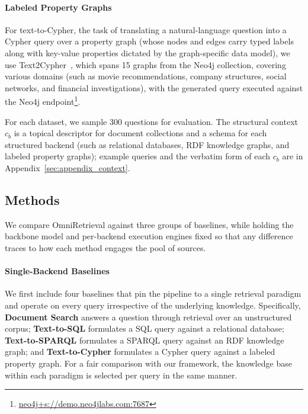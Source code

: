 \vspace{-0.075in}
\paragraph{Labeled Property Graphs}
For text-to-Cypher, the task of translating a natural-language question into a Cypher query over a property graph (whose nodes and edges carry typed labels along with key-value properties dictated by the graph-specific data model), we use Text2Cypher~\citep{Text2Cypher}, which spans 15 graphs from the Neo4j collection, covering various domains (such as movie recommendations, company structures, social networks, and financial investigations), with the generated query executed against the Neo4j endpoint\footnote{\url{neo4j+s://demo.neo4jlabs.com:7687}}.

For each dataset, we sample 300 questions for evaluation. The structural context $c_b$ is a topical descriptor for document collections and a schema for each structured backend (such as relational databases, RDF knowledge graphs, and labeled property graphs); example queries and the verbatim form of each $c_b$ are in Appendix~\ref{sec:appendix_context}.

\subsection{Methods}

We compare OmniRetrieval against three groups of baselines, while holding the backbone model and per-backend execution engines fixed so that any difference traces to how each method engages the pool of sources.

\vspace{-0.025in}
\paragraph{Single-Backend Baselines}
We first include four baselines that pin the pipeline to a single retrieval paradigm and operate on every query irrespective of the underlying knowledge. Specifically, \textbf{Document Search} answers a question through retrieval over an unstructured corpus; \textbf{Text-to-SQL} formulates a SQL query against a relational database; \textbf{Text-to-SPARQL} formulates a SPARQL query against an RDF knowledge graph; and \textbf{Text-to-Cypher} formulates a Cypher query against a labeled property graph. For a fair comparison with our framework, the knowledge base within each paradigm is selected per query in the same manner.

